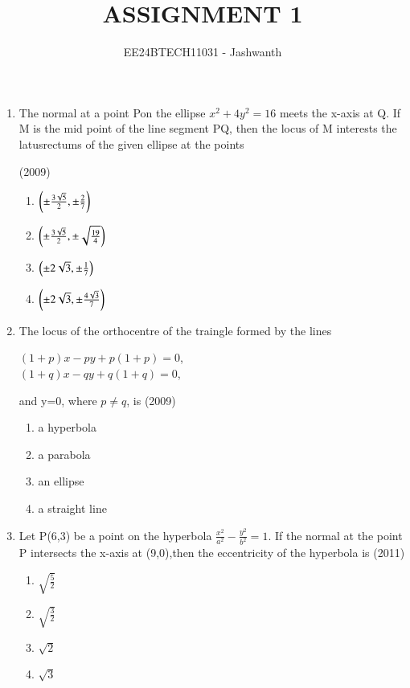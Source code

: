 \documentclass[journal,12pt,onecolumn]{IEEEtran}
\theoremstyle{remark}
\begin{document}

\vspace{3cm}

\title{ASSIGNMENT 1}
\author{EE24BTECH11031 - Jashwanth}
\maketitle
\newpage
\bigskip

\begin{enumerate}
\item The normal at a point Pon the ellipse  $x^2 +4y^2=16$ meets the x-axis at Q. If M is the mid point of the line segment PQ, then the locus of M interests the latusrectums of the given ellipse at the points
	
	\hfill (2009)
		\begin{enumerate}
			\item $\left(\pm\frac{3\sqrt{5}}{2},\pm\frac{2}{7}\right)$
			\item $\left(\pm\frac{3\sqrt{5}}{2},\pm\sqrt{\frac{19}{4}}\right)$
			\item $\left(\pm2\sqrt{3},\pm\frac{1}{7}\right)$
			\item $\left(\pm2\sqrt{3},\pm\frac{4\sqrt{3}}{7}\right)$	
		\end{enumerate}
		
	\item The locus of the orthocentre of the traingle formed by the lines\\
		\begin{center}
		$(1+p)x-py+p(1+p)=0$,\\
		$(1+q)x-qy+q(1+q)=0$,\\
		\end{center}
		and y=0, where $p \neq q$, is
		\hfill(2009)
\begin{enumerate}
	\item a hyperbola
	\item a parabola
	\item an ellipse
	\item a straight line
\end{enumerate}

\item Let P(6,3) be a point on the hyperbola $\frac{x^2}{a^2}-\frac{y^2}{b^2}=1$. If the normal at the point P intersects the x-axis at (9,0),then the eccentricity of the hyperbola is
	\hfill (2011)\\
		\begin{enumerate}
			\item$\sqrt{\frac{5}{2}}$
			\item$\sqrt{\frac{3}{2}}$
			\item$\sqrt{2}$
			\item$\sqrt{3}$
		\end{enumerate}


\end{enumerate}
\end{document}
